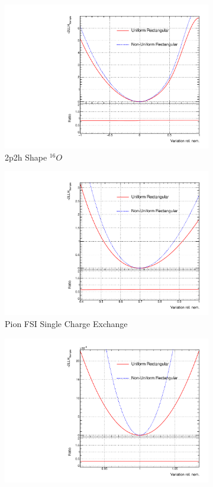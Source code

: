 \begin{figure}
\centering
\begin{subfigure}{.49\textwidth}
  \centering
  \includegraphics[width=0.95\linewidth]{figs/2p2h_shape_O_sampolyLLH}
  \caption{2p2h Shape $^{16}O$}
  \label{fig:2p2h_shape_O_sampolyLLH}
\end{subfigure}
\begin{subfigure}{.49\textwidth}
  \centering
  \includegraphics[width=0.95\linewidth]{figs/FEFCX_sampolyLLH}
  \caption{Pion FSI Single Charge Exchange}
  \label{fig:FEFCX_sampolyLLH}
\end{subfigure}
\begin{subfigure}{.49\textwidth}
  \centering
  \includegraphics[width=0.95\linewidth]{figs/b_18_sampolyLLH}

\end{subfigure}
\end{figure}
